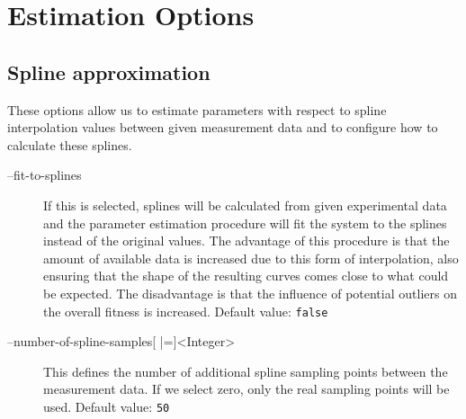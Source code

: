 \section{Estimation Options}
\subsection{Spline approximation}
These options allow us to estimate parameters with respect to spline interpolation values between given measurement data and to configure how to calculate these splines.
\begin{description}
\item[--fit-to-splines]
          If this is selected, splines will be calculated from given experimental
          data and the parameter estimation procedure will fit the system
          to the splines instead of the original values. The advantage
          of this procedure is that the amount of available data is increased
          due to this form of interpolation, also ensuring that the shape
          of the resulting curves comes close to what could be expected.
          The disadvantage is that the influence of potential outliers
          on the overall fitness is increased.
          Default value: \texttt{false}
\item[--number-of-spline-samples{[} |={]}<Integer>]
          This defines the number of additional spline sampling points
          between the measurement data. If we select zero, only the real
          sampling points will be used.
          Default value: \texttt{50}
\end{description}

